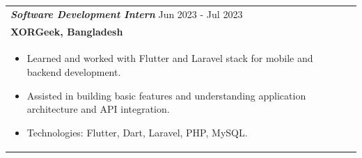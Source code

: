 \documentclass[a4paper,8pt]{article}
\begin{document}
\vspace{2pt}

\begin{tabularx}{\linewidth}{ @{}l r@{} }
\color[HTML]{371e77}\textbf{\textit{Software Development Intern}} \hfill \color[HTML]{371e77} Jun 2023 - Jul 2023 \\[2pt]
\textbf{{XORGeek, Bangladesh}} \hfill \\[2.5pt]
\begin{minipage}[t]{\linewidth}
\begin{itemize}[nosep,after=\strut, leftmargin=1.5em, itemsep=1.5pt]
\item Learned and worked with Flutter and Laravel stack for mobile and backend development.
\item Assisted in building basic features and understanding application architecture and API integration.
\item Technologies: Flutter, Dart, Laravel, PHP, MySQL.
\end{itemize}
\end{minipage}
\end{tabularx}

\vspace{1pt}
\end{document}
